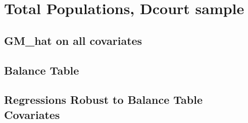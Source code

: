 \documentclass{article}
\begin{document}
\section{Total Populations, Dcourt sample}
\subsection{GM\_hat on all covariates}

\clearpage
\subsection{Balance Table}

\clearpage
\subsection{Regressions Robust to Balance Table Covariates}
\begin{landscape}

\clearpage

\clearpage

\clearpage

\clearpage
\end{landscape}
\end{document}
